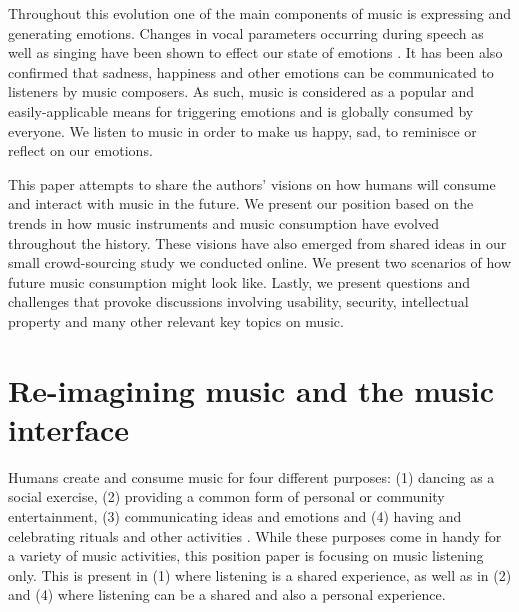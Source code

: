 \documentclass[sigchi]{acmart}
\begin{document}
Throughout this evolution one of the main components of music is expressing and generating emotions. Changes in vocal parameters occurring during speech as well as singing have been shown to effect our state of emotions \cite{kappert2019aim}. It has been also confirmed that sadness, happiness and other emotions can be communicated to listeners by music composers. As such, music is considered as a popular and easily-applicable means for triggering emotions \cite{kappert2019aim} and is globally consumed by everyone. We listen to music in order to make us happy, sad, to reminisce or reflect on our emotions. 

This paper attempts to share the authors' visions on how humans will consume and interact with music in the future. We present our position based on the trends in how music instruments and music consumption have evolved throughout the history. These visions have also emerged from shared ideas in our small crowd-sourcing study we conducted online. We present two scenarios of how future music consumption might look like. Lastly, we present questions and challenges that provoke discussions involving usability, security, intellectual property and many other relevant key topics on music. 

\section{Re-imagining music and the music interface}
Humans create and consume music for four different purposes: (1) dancing as a social exercise, (2) providing a common form of personal or community entertainment, (3) communicating ideas and emotions and (4) having and celebrating rituals and other activities \cite{montagu2017music}. While these purposes come in handy for a variety of music activities, this position paper is focusing on music listening only. This is present in (1) where listening is a shared experience, as well as in (2) and (4) where listening can be a  shared and also a personal experience. 
\end{document}
